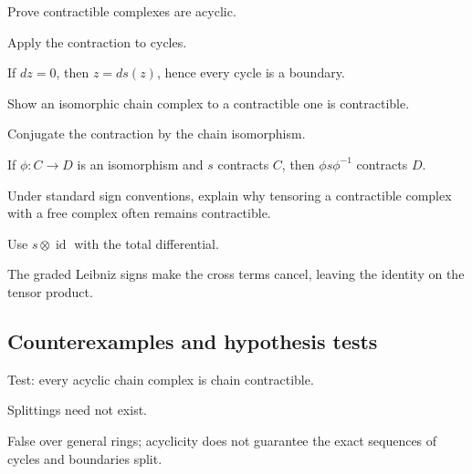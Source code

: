 \begin{exercise}\label{exr:viii23-ped-07}
Prove contractible complexes are acyclic.
\end{exercise}
\begin{hint}
Apply the contraction to cycles.
\end{hint}
\begin{solution}
If $dz=0$, then $z=ds(z)$, hence every cycle is a boundary.
\end{solution}

\begin{exercise}\label{exr:viii23-ped-08}
Show an isomorphic chain complex to a contractible one is contractible.
\end{exercise}
\begin{hint}
Conjugate the contraction by the chain isomorphism.
\end{hint}
\begin{solution}
If $\phi:C\to D$ is an isomorphism and $s$ contracts $C$, then $\phi s\phi^{-1}$ contracts $D$.
\end{solution}

\begin{exercise}\label{exr:viii23-ped-09}
Under standard sign conventions, explain why tensoring a contractible complex with a free complex often remains contractible.
\end{exercise}
\begin{hint}
Use $s\otimes\operatorname{id}$ with the total differential.
\end{hint}
\begin{solution}
The graded Leibniz signs make the cross terms cancel, leaving the identity on the tensor product.
\end{solution}

\subsection*{Counterexamples and hypothesis tests}

\begin{exercise}\label{exr:viii23-ped-10}
Test: every acyclic chain complex is chain contractible.
\end{exercise}
\begin{hint}
Splittings need not exist.
\end{hint}
\begin{solution}
False over general rings; acyclicity does not guarantee the exact sequences of cycles and boundaries split.
\end{solution}

